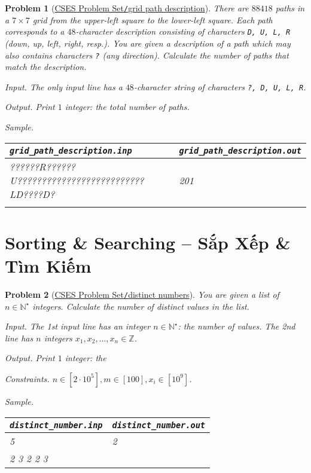 \documentclass{article}
\newtheorem{problem}{Problem}
\begin{document}
\begin{problem}[\href{https://cses.fi/problemset/task/1625}{CSES Problem Set{\tt/}grid path description}]
    There are $88418$ paths in a $7\times7$ grid from the upper-left square to the lower-left square. Each path corresponds to a $48$-character description consisting of characters {\tt D, U, L, R} (down, up, left, right, resp.). You are given a description of a path which may also contains characters {\tt?} (any direction). Calculate the number of paths that match the description.
    \item {\sf Input.} The only input line has a $48$-character string of characters {\tt?, D, U, L, R}.
    \item {\sf Output.} Print $1$ integer: the total number of paths.
    \item {\sf Sample.}
    \begin{table}[H]
        \centering
        \begin{tabular}{|l|l|}
            \hline
            \verb|grid_path_description.inp| & \verb|grid_path_description.out| \\
            \hline
            ??????R??????U??????????????????????????LD????D? & 201 \\
            & \\
            \hline
        \end{tabular}
    \end{table}
\end{problem}


\section{Sorting \& Searching -- Sắp Xếp \& Tìm Kiếm}

\begin{problem}[\href{https://cses.fi/problemset/task/1621}{CSES Problem Set{\tt/}distinct numbers}]
    You are given a list of $n\in\mathbb{N}^\star$ integers. Calculate the number of {\rm distinct} values in the list.
    \item {\sf Input.} The 1st input line has an integer $n\in\mathbb{N}^\star$: the number of values. The 2nd line has $n$ integers $x_1,x_2,\ldots,x_n\in\mathbb{Z}$.
    \item {\sf Output.} Print $1$ integer: the 
    \item {\sf Constraints.} $n\in[2\cdot10^5],m\in[100],x_i\in[10^9]$.
    \item {\sf Sample.}
    \begin{table}[H]
        \centering
        \begin{tabular}{|l|l|}
            \hline
            \verb|distinct_number.inp| & \verb|distinct_number.out| \\
            \hline
            5 & 2 \\
            2 3 2 2 3 & \\
            \hline
        \end{tabular}
    \end{table}
\end{problem}
\end{document}
